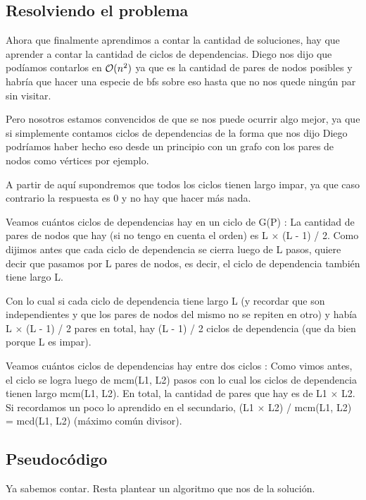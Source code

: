 \subsection{Resolviendo el problema}
	Ahora que finalmente aprendimos a contar la cantidad de soluciones, hay que aprender a contar la cantidad de ciclos de dependencias. Diego nos dijo que podíamos contarlos en $\mathcal{O}(n^{2})$ ya que es la cantidad de pares de nodos posibles y habría que hacer una especie de bfs sobre eso hasta que no nos quede ningún par sin visitar. \newline

	Pero nosotros estamos convencidos de que se nos puede ocurrir algo mejor, ya que si simplemente contamos ciclos de dependencias de la forma que nos dijo Diego podríamos haber hecho eso desde un principio con un grafo con los pares de nodos como vértices por ejemplo. \newline

	A partir de aquí supondremos que todos los ciclos tienen largo impar, ya que caso contrario la respuesta es 0 y no hay que hacer más nada. \newline

	Veamos cuántos ciclos de dependencias hay en un ciclo de G(P) : La cantidad de pares de nodos que hay (si no tengo en cuenta el orden) es L $\times$ (L - 1) / 2. Como dijimos antes que cada ciclo de dependencia se cierra luego de L pasos, quiere decir que pasamos por L pares de nodos, es decir, el ciclo de dependencia también tiene largo L. \newline  

	Con lo cual si cada ciclo de dependencia tiene largo L (y recordar que son independientes y que los pares de nodos del mismo no se repiten en otro) y había L $\times$ (L - 1) / 2 pares en total, hay (L - 1) / 2 ciclos de dependencia (que da bien porque L es impar).

	Veamos cuántos ciclos de dependencias hay entre dos ciclos : Como vimos antes, el ciclo se logra luego de mcm(L1, L2) pasos con lo cual los ciclos de dependencia tienen largo mcm(L1, L2). En total, la cantidad de pares que hay es de L1 $\times$ L2. Si recordamos un poco lo aprendido en el secundario, (L1 $\times$ L2) / mcm(L1, L2) = mcd(L1, L2) (máximo común divisor). \newline


\subsection{Pseudocódigo}
	Ya sabemos contar. Resta plantear un algoritmo que nos de la solución.

